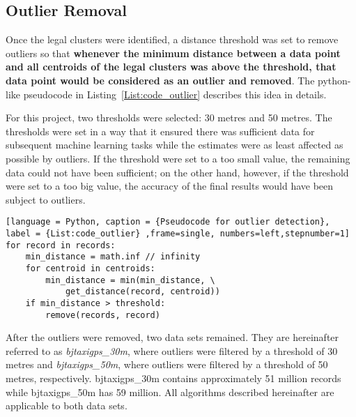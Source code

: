 \subsection{Outlier Removal}
Once the legal clusters were identified, a distance threshold was set to remove outliers so that \textbf{whenever the minimum distance between a data point and all centroids of the legal clusters was above the threshold, that data point would be considered as an outlier and removed}. The python-like pseudocode in Listing~\ref{List:code_outlier} describes this idea in details. 

For this project, two thresholds were selected: 30 metres and 50 metres. The thresholds were set in a way that it ensured there was sufficient data for subsequent machine learning tasks while the estimates were as least affected as possible by outliers. If the threshold were set to a too small value, the remaining data could not have been sufficient; on the other hand, however, if the threshold were set to a too big value, the accuracy of the final results would have been subject to outliers. 

\begin{lstlisting}[language = Python, caption = {Pseudocode for outlier detection}, label = {List:code_outlier} ,frame=single, numbers=left,stepnumber=1]
for record in records:
	min_distance = math.inf // infinity
	for centroid in centroids:
		min_distance = min(min_distance, \
			get_distance(record, centroid))
	if min_distance > threshold:
		remove(records, record)
\end{lstlisting}

After the outliers were removed, two data sets remained. They are hereinafter referred to as \emph{bjtaxigps\_30m}, where outliers were filtered by a threshold of 30 metres and \emph{bjtaxigps\_50m}, where outliers were filtered by a threshold of 50 metres, respectively. bjtaxigps\_30m contains approximately 51 million records while bjtaxigps\_50m has 59 million. All algorithms described hereinafter are applicable to both data sets. 
